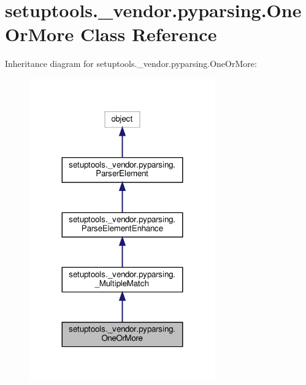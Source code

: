 \hypertarget{classsetuptools_1_1__vendor_1_1pyparsing_1_1OneOrMore}{}\section{setuptools.\+\_\+vendor.\+pyparsing.\+One\+Or\+More Class Reference}
\label{classsetuptools_1_1__vendor_1_1pyparsing_1_1OneOrMore}


Inheritance diagram for setuptools.\+\_\+vendor.\+pyparsing.\+One\+Or\+More\+:
\nopagebreak
\begin{figure}[H]
\begin{center}
\leavevmode
\includegraphics[width=227pt]{classsetuptools_1_1__vendor_1_1pyparsing_1_1OneOrMore__inherit__graph}
\end{center}
\end{figure}


